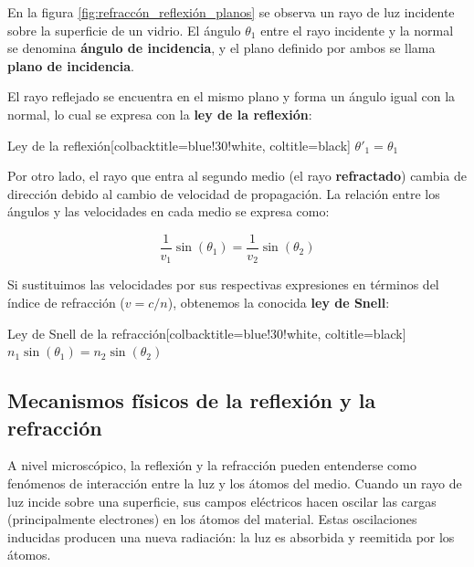 En la figura \ref{fig:refraccón_reflexión_planos} se observa un rayo de luz incidente sobre la superficie de un vidrio. El ángulo $\theta_1$ entre el rayo incidente y la normal se denomina \textbf{ángulo de incidencia}, y el plano definido por ambos se llama \textbf{plano de incidencia}.

El rayo reflejado se encuentra en el mismo plano y forma un ángulo igual con la normal, lo cual se expresa con la \textbf{ley de la reflexión}:

\begin{mybox}[blue]{Ley de la reflexión}[colbacktitle=blue!30!white, coltitle=black]
	$\theta'_1 = \theta_1$
\end{mybox}

Por otro lado, el rayo que entra al segundo medio (el rayo \textbf{refractado}) cambia de dirección debido al cambio de velocidad de propagación. La relación entre los ángulos y las velocidades en cada medio se expresa como:

\begin{equation}
	\frac{1}{v_1} \sin(\theta_1) = \frac{1}{v_2} \sin(\theta_2)
	\label{eq:refraccion_dos_medios}
\end{equation}

Si sustituimos las velocidades por sus respectivas expresiones en términos del índice de refracción ($v = c/n$), obtenemos la conocida \textbf{ley de Snell}:

\begin{mybox}[blue]{Ley de Snell de la refracción}[colbacktitle=blue!30!white, coltitle=black]
	$n_1 \sin(\theta_1) = n_2 \sin(\theta_2)$
\end{mybox} 

\vspace{0.3cm}

\subsection{Mecanismos físicos de la reflexión y la refracción}

A nivel microscópico, la reflexión y la refracción pueden entenderse como fenómenos de interacción entre la luz y los átomos del medio. Cuando un rayo de luz incide sobre una superficie, sus campos eléctricos hacen oscilar las cargas (principalmente electrones) en los átomos del material. Estas oscilaciones inducidas producen una nueva radiación: la luz es absorbida y reemitida por los átomos.

